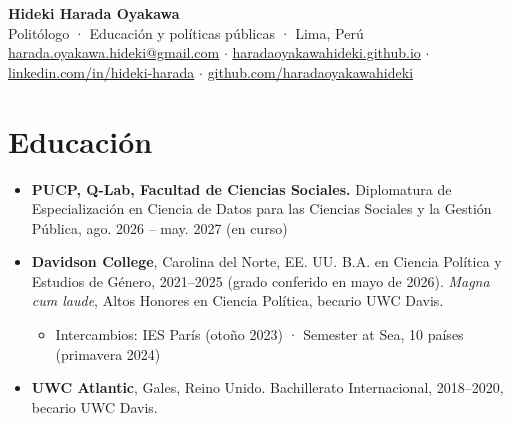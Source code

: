 \documentclass[10pt,a4paper]{article}
\newcommand{\serif}{\fontfamily{IBMPlexSerif-TLF}\selectfont}
\begin{document}
{\serif\Huge\bfseries\color{navy} Hideki Harada Oyakawa}\\[2pt]
{\small\color{gray} Politólogo · Educación y políticas públicas · Lima, Perú}\\
{\small \href{mailto:harada.oyakawa.hideki@gmail.com}{harada.oyakawa.hideki@gmail.com} $\cdot$ \href{https://haradaoyakawahideki.github.io}{haradaoyakawahideki.github.io} $\cdot$ \href{https://www.linkedin.com/in/hideki-harada}{linkedin.com/in/hideki-harada} $\cdot$ \href{https://github.com/haradaoyakawahideki}{github.com/haradaoyakawahideki}}
\section*{Educación}
\begin{itemize}
\item \textbf{PUCP, Q-Lab, Facultad de Ciencias Sociales.} Diplomatura de Especialización en Ciencia de Datos para las Ciencias Sociales y la Gestión Pública, ago. 2026 – may. 2027 (en curso)
\item \textbf{Davidson College}, Carolina del Norte, EE. UU. B.A. en Ciencia Política y Estudios de Género, 2021–2025 (grado conferido en mayo de 2026). \textit{Magna cum laude}, Altos Honores en Ciencia Política, becario UWC Davis.
\begin{itemize}
\item Intercambios: IES París (otoño 2023) · Semester at Sea, 10 países (primavera 2024)
\end{itemize}
\item \textbf{UWC Atlantic}, Gales, Reino Unido. Bachillerato Internacional, 2018–2020, becario UWC Davis.
\end{itemize}
\end{document}
